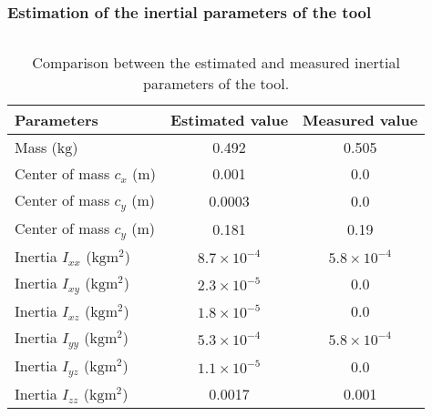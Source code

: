 \documentclass[aspectratio=1610]{beamer}
\begin{document}
\begin{frame}
\frametitle{Estimation of the inertial parameters of the tool}
\begin{columns}
\column{37em}
  \begin{table}[h]
    \begin{center}
      \renewcommand{\arraystretch}{1.2} %
      \begin{tabular}{l|c|c} %
        \textbf{Parameters} & \textbf{Estimated value} & \textbf{Measured value}\\
        \hline
        Mass ($\si{\kilogram}$)  & 0.492 & 0.505 \\
        \hline
        Center of mass $c_x$ ($\si{\meter}$)  & 0.001 & 0.0 \\
        \hline
        Center of mass $c_y$ ($\si{\meter}$)  & 0.0003 & 0.0 \\
        \hline
        Center of mass $c_y$ ($\si{\meter}$)  & 0.181 & 0.19 \\
        \hline
        Inertia $I_{xx}$ ($\si{\kilogram\meter\squared}$)  & $8.7 \times 10^{-4}$ & $5.8 \times 10^{-4}$ \\
        \hline
        Inertia $I_{xy}$ ($\si{\kilogram\meter\squared}$)  & $2.3 \times 10^{-5}$ & 0.0 \\
        \hline
        Inertia $I_{xz}$ ($\si{\kilogram\meter\squared}$)  & $1.8 \times 10^{-5}$ & 0.0 \\
        \hline
        Inertia $I_{yy}$ ($\si{\kilogram\meter\squared}$)  & $5.3 \times 10^{-4}$ & $5.8 \times 10^{-4}$ \\
        \hline
        Inertia $I_{yz}$ ($\si{\kilogram\meter\squared}$)  & $1.1 \times 10^{-5}$ & 0.0 \\
        \hline
        Inertia $I_{zz}$ ($\si{\kilogram\meter\squared}$)  & 0.0017 & 0.001 \\
        \hline
      \end{tabular}
    \end{center}
    \vspace*{-0.1cm}
    \caption{Comparison between the estimated and measured inertial parameters of the tool.\label{tab:results:calibration-tool}}
  \end{table}
\end{columns}

\end{frame}
\end{document}
